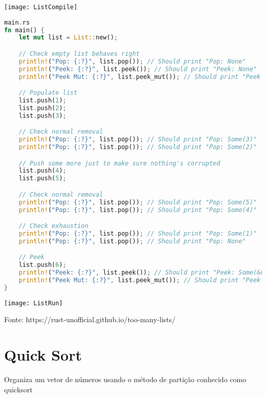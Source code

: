 \texttt{[image: ListCompile]}
\newpage
\begin{lstlisting}[language=rust]
main.rs
fn main() {
    let mut list = List::new();

    // Check empty list behaves right
    println!("Pop: {:?}", list.pop()); // Should print "Pop: None"
    println!("Peek: {:?}", list.peek()); // Should print "Peek: None"
    println!("Peek Mut: {:?}", list.peek_mut()); // Should print "Peek Mut: None"

    // Populate list
    list.push(1);
    list.push(2);
    list.push(3);

    // Check normal removal
    println!("Pop: {:?}", list.pop()); // Should print "Pop: Some(3)"
    println!("Pop: {:?}", list.pop()); // Should print "Pop: Some(2)"

    // Push some more just to make sure nothing's corrupted
    list.push(4);
    list.push(5);

    // Check normal removal
    println!("Pop: {:?}", list.pop()); // Should print "Pop: Some(5)"
    println!("Pop: {:?}", list.pop()); // Should print "Pop: Some(4)"

    // Check exhaustion
    println!("Pop: {:?}", list.pop()); // Should print "Pop: Some(1)"
    println!("Pop: {:?}", list.pop()); // Should print "Pop: None"

    // Peek
    list.push(6);
    println!("Peek: {:?}", list.peek()); // Should print "Peek: Some(&6)"
    println!("Peek Mut: {:?}", list.peek_mut()); // Should print "Peek Mut: Some(&mut 6)"
}
\end{lstlisting}

\texttt{[image: ListRun]}

Fonte: https://rust-unofficial.github.io/too-many-lists/

\section{Quick Sort}
  Organiza um vetor de n\'{u}meros usando o m\'{e}todo de parti\c{c}\~{a}o conhecido como quicksort

